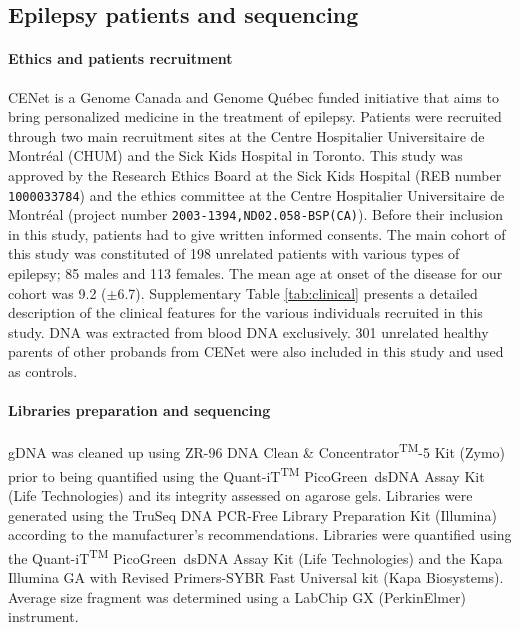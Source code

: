 \subsection*{Epilepsy patients and sequencing}

\paragraph{Ethics and patients recruitment}
CENet is a Genome Canada and Genome Qu\'ebec funded initiative that aims to bring personalized medicine in the treatment of epilepsy. Patients were recruited through two main recruitment sites at the Centre Hospitalier Universitaire de Montr\'eal (CHUM) and the Sick Kids Hospital in Toronto.
This study was approved by the Research Ethics Board at the Sick Kids Hospital (REB number \verb!1000033784!) and the ethics committee at the Centre Hospitalier Universitaire de Montr\'eal (project number \verb!2003-1394,ND02.058-BSP(CA)!).
Before their inclusion in this study, patients had to give written informed consents. The main cohort of this study was constituted of 198 unrelated patients with various types of epilepsy; 85 males and 113 females. The mean age at onset of the disease for our cohort was 9.2 ($\pm$6.7). Supplementary Table \ref{tab:clinical} presents a detailed description of the clinical features for the various individuals recruited in this study. DNA was extracted from blood DNA exclusively.
301 unrelated healthy parents of other probands from CENet were also included in this study and used as controls.

\paragraph{Libraries preparation and sequencing}
gDNA was cleaned up using ZR-96 DNA Clean \& Concentrator\textsuperscript{TM}-5 Kit (Zymo) prior to being quantified using the Quant-iT\textsuperscript{TM} PicoGreen\textregistered\ dsDNA Assay Kit (Life Technologies) and its integrity assessed on agarose gels.
Libraries were generated using the TruSeq DNA PCR-Free Library Preparation Kit (Illumina) according to the manufacturer's recommendations.
Libraries were quantified using the Quant-iT\textsuperscript{TM} PicoGreen\textregistered\ dsDNA Assay Kit (Life Technologies) and the Kapa Illumina GA with Revised Primers-SYBR Fast Universal kit (Kapa Biosystems).
Average size fragment was determined using a LabChip GX (PerkinElmer) instrument.


